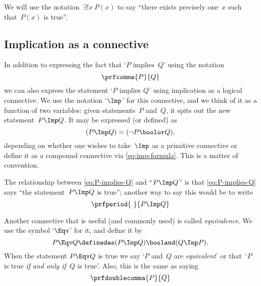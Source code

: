 We will use the notation~$\exists! x \ P(x)$ to say ``there exists precisely one~$x$ such that~$P(x)$ is true''.

\subsection{Implication as a connective}

In addition to expressing the fact that `$P$ implies~$Q$' using the notation
\begin{equation}
    \label{eq:P-implies-Q}
    \prfcomma
    {P}{Q}
\end{equation}
we can also express the statement `$P$ implies $Q$' using implication as a logical connective.
We use the notation `$\Imp$' for this connective, and we think of it as a function of two variables:
given statements~$P$ and~$Q$, it spits out the new statement~$P \Imp Q$.
It may be expressed (or defined) as
\begin{equation}
    \label{eq:imp-formula}
    (P \Imp Q) = (\lnot P \boolor Q),
\end{equation}
depending on whether one wishes to take~$\Imp$ as a primitive connective or define it as a compound connective via \cref{eq:imp-formula}.
This is a matter of convention.

The relationship between \cref{eq:P-implies-Q} and ``$P \Imp Q$'' is that \cref{eq:P-implies-Q} says ``the statement~$P \Imp Q$ is true''; another way to say this would be to write
\begin{equation}
    \prfperiod
    {\ }{P \Imp Q}
\end{equation}

Another connective that is useful (and commonly used) is called \emph{equivalence}.
We use the symbol `$\Eqv$' for it, and define it by
\begin{equation}
    P \Eqv Q \definedas (P \Imp Q) \booland (Q \Imp P).
\end{equation}
When the statement $P \Eqv Q$ is true we say `$P$ and~$Q$ are \emph{equivalent}' or that~`$P$ is true \emph{if and only if}~$Q$ is true'.
Also, this is the same as saying
\begin{equation}
    \prfdoublecomma{
        P
    }{
        Q
    }
\end{equation}